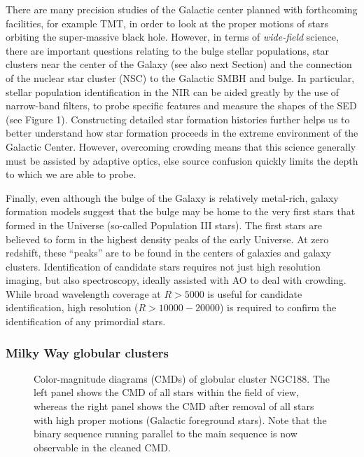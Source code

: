 There are many precision studies of the Galactic center planned with
forthcoming facilities, for example TMT, in order to look at the proper
motions of stars orbiting the super-massive black hole. However, in
terms of {\it wide-field} science, there are important questions
relating to the bulge stellar populations, star clusters near the center
of the Galaxy (see also next Section) and the connection of the nuclear
star cluster (NSC) to the Galactic SMBH and bulge. In particular,
stellar population identification in the NIR can be aided greatly by the
use of narrow-band filters, to probe specific features and measure the
shapes of the SED (see Figure 1). Constructing detailed star formation
histories further helps us to better understand how star formation
proceeds in the extreme environment of the Galactic Center. However,
overcoming crowding means that this science generally must be assisted
by adaptive optics, else source confusion quickly limits the depth to
which we are able to probe. 

Finally, even although the bulge of the Galaxy is relatively metal-rich,
galaxy formation models suggest that the bulge may be home to the very
first stars that formed in the Universe (so-called Population III
stars). The first stars are believed to form in the highest density
peaks of the early Universe. At zero redshift, these ``peaks'' are to be
found in the centers of galaxies and galaxy clusters. Identification of
candidate stars requires not just high resolution imaging, but also
spectroscopy, ideally assisted with AO to deal with crowding. While
broad wavelength coverage at $R>5000$ is useful for candidate
identification, high resolution ($R>10000-20000$) is required to confirm
the identification of any primordial stars. 

\subsubsection{Milky Way globular clusters}

\begin{figure*}
  \begin{center}
    \caption{Color-magnitude diagrams (CMDs) of globular cluster
   NGC188. The left panel shows the CMD of all stars within the field of
   view, whereas the right panel shows the CMD after removal of all
   stars with high proper motions (Galactic foreground stars). Note that
   the binary sequence running parallel to the main sequence is now
   observable in the cleaned CMD.} 
  \end{center}
\end{figure*}

